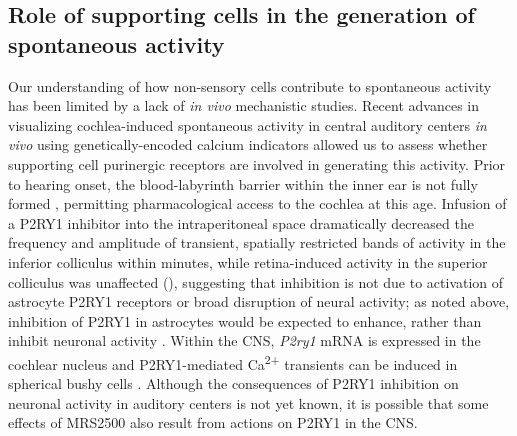 \documentclass[9pt,lineno]{elife}
\begin{document}
\subsection{Role of supporting cells in the generation of spontaneous activity}
Our understanding of how non-sensory cells contribute to spontaneous activity has been limited by a lack of \textit{in vivo} mechanistic studies. Recent advances in visualizing cochlea-induced spontaneous activity in central auditory centers \textit{in vivo} using genetically-encoded calcium indicators \citep{Babola2018} allowed us to assess whether supporting cell purinergic receptors are involved in generating this activity. Prior to hearing onset, the blood-labyrinth barrier within the inner ear is not fully formed \citep{Suzuki1998}, permitting pharmacological access to the cochlea at this age. Infusion of a P2RY1 inhibitor into the intraperitoneal space dramatically decreased the frequency and amplitude of transient, spatially restricted bands of activity in the inferior colliculus within minutes, while retina-induced activity in the superior colliculus \citep{Ackman2012} was unaffected (), suggesting that inhibition is not due to activation of astrocyte P2RY1 receptors or broad disruption of neural activity; as noted above, inhibition of P2RY1 in astrocytes would be expected to enhance, rather than inhibit neuronal activity \citep{Wang2012}. Within the CNS, \textit{P2ry1} mRNA is expressed in the cochlear nucleus and P2RY1-mediated Ca\textsuperscript{2+} transients can be induced in spherical bushy cells \citep{Milenkovic2009}. Although the consequences of P2RY1 inhibition on neuronal activity in auditory centers is not yet known, it is possible that some effects of MRS2500 also result from actions on P2RY1 in the CNS. 
\end{document}
